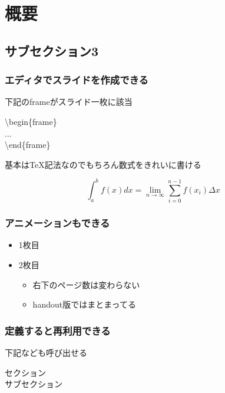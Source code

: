 \section{概要}

\subsection{サブセクション3}

\begin{frame}{}
  \frametitle{エディタでスライドを作成できる}

    下記のframeがスライド一枚に該当

    \begin{center}
      \textbackslash begin\{frame\} \\
      ... \\
      \textbackslash end\{frame\}
    \end{center}

    \bigskip

    基本は\TeX 記法なのでもちろん数式をきれいに書ける

      \begin{displaymath}
        \int^{b}_{a} f(x) dx = \lim_{n \to \infty} \sum^{n-1}_{i=0} f(x_{i}) \Delta x
      \end{displaymath}
\end{frame}

\begin{frame}{}
  \frametitle{アニメーションもできる}
  \begin{itemize}
    \item 1枚目
    \item 2枚目
      \begin{itemize}
        \item 右下のページ数は変わらない
        \item handout版ではまとまってる
      \end{itemize}
  \end{itemize}
\end{frame}

\begin{frame}{}
  \frametitle{定義すると再利用できる}
  下記なども呼び出せる
  \begin{description}
    \item [セクション] \insertsection
    \item [サブセクション] \insertsubsection
  \end{description}
\end{frame}
